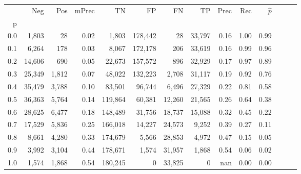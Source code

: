 \begin{tabular}{rrrrrrrrrrrrrr}
\toprule
{} &     Neg &    Pos & mPrec &       TN &       FP &      FN &      TP &  Prec &   Rec & $\hat{p}$ \\
p   &         &        &       &          &          &         &         &       &       &           \\
\midrule
0.0 &   1,803 &     28 &  0.02 &    1,803 &  178,442 &      28 &  33,797 &  0.16 &  1.00 &      0.99 \\
0.1 &   6,264 &    178 &  0.03 &    8,067 &  172,178 &     206 &  33,619 &  0.16 &  0.99 &      0.96 \\
0.2 &  14,606 &    690 &  0.05 &   22,673 &  157,572 &     896 &  32,929 &  0.17 &  0.97 &      0.89 \\
0.3 &  25,349 &  1,812 &  0.07 &   48,022 &  132,223 &   2,708 &  31,117 &  0.19 &  0.92 &      0.76 \\
0.4 &  35,479 &  3,788 &  0.10 &   83,501 &   96,744 &   6,496 &  27,329 &  0.22 &  0.81 &      0.58 \\
0.5 &  36,363 &  5,764 &  0.14 &  119,864 &   60,381 &  12,260 &  21,565 &  0.26 &  0.64 &      0.38 \\
0.6 &  28,625 &  6,477 &  0.18 &  148,489 &   31,756 &  18,737 &  15,088 &  0.32 &  0.45 &      0.22 \\
0.7 &  17,529 &  5,836 &  0.25 &  166,018 &   14,227 &  24,573 &   9,252 &  0.39 &  0.27 &      0.11 \\
0.8 &   8,661 &  4,280 &  0.33 &  174,679 &    5,566 &  28,853 &   4,972 &  0.47 &  0.15 &      0.05 \\
0.9 &   3,992 &  3,104 &  0.44 &  178,671 &    1,574 &  31,957 &   1,868 &  0.54 &  0.06 &      0.02 \\
1.0 &   1,574 &  1,868 &  0.54 &  180,245 &        0 &  33,825 &       0 &   nan &  0.00 &      0.00 \\
\bottomrule
\end{tabular}
